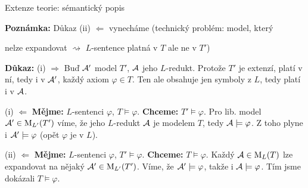 \documentclass{beamer}
\begin{document}
\begin{frame}{Extenze teorie: sémantický popis}

    
    {\small \textbf{Poznámka:} Důkaz \alert{(ii) \Large $\Leftarrow$} vynecháme (technický problém: model, který

    \vspace{-11pt} nelze expandovat $\rightsquigarrow$ $L$-sentence platná v $T$ ale ne v $T'$)}

    \vspace{-3pt}
    \textbf{Důkaz:}
    \alert{(i) \Large $\Rightarrow$} Buď $\mathcal{A}'$ model $T'$, $\mathcal{A}$ jeho $L$-redukt. Protože $T'$ je extenzí, platí v ní, tedy i v $\mathcal{A}'$, každý axiom $\varphi\in T$. Ten ale obsahuje jen symboly z $L$, tedy platí i v $\mathcal{A}$.
    
    \vspace{-3pt}
    \alert{(i) \Large $\Leftarrow$} \textbf{Mějme:} $L$-sentenci $\varphi$,  $T\models\varphi$. \textbf{Chceme:} $T'\models\varphi$. Pro lib. model $\mathcal{A}'\in\operatorname{M}_{L'}(T')$ víme, že jeho $L$-redukt $\mathcal{A}$ je modelem $T$, tedy $\mathcal{A}\models\varphi$. Z toho plyne i $\mathcal{A}'\models\varphi$ (opět $\varphi$ je v $L$).
    
    \vspace{-3pt}
    \alert{(ii) \Large $\Leftarrow$} \textbf{Mějme:} $L$-sentenci $\varphi$,  $T'\models\varphi$. \textbf{Chceme:} $T\models\varphi$. Každý $\mathcal{A}\in\operatorname{M}_L(T)$ lze expandovat na nějaký $\mathcal{A}'\in\operatorname{M}_{L'}(T')$. Víme, že $\mathcal{A}'\models\varphi$, takže i $\mathcal{A}\models\varphi$. Tím jsme dokázali $T\models\varphi$.    
    \hfill\qedsymbol
    
\end{frame}
\end{document}
